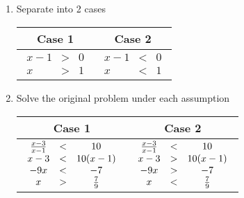 \begin{enumerate}
	\item
	      Separate into 2 cases \\
	      \begin{table}[H]
		      \centering
		      \begin{tabular}{|c|c|} \hline
			      \textbf{Case 1} & \textbf{Case 2}                \\ \hline
			      $ \begin{array}{ccc} x - 1 & > & 0 \\ x & > & 1 \end{array} $
			                      & $ \begin{array}{ccc} x - 1 & < & 0 \\ x & < & 1 \end{array} $ \\ \hline
		      \end{tabular}
	      \end{table}

	\item
	      Solve the original problem under each assumption \\
	      \begin{table}[H]
		      \centering
		      \begin{tabular}{|c|c|} \hline
			      \textbf{Case 1} & \textbf{Case 2}                \\ \hline
			      $ \begin{array}{ccc} {x-3 \over x-1} & < & 10 \\ x - 3 & < & 10(x-1) \\ -9x & < & -7 \\x & > & {7 \over 9} \end{array} $
			                      & $ \begin{array}{ccc} {x-3 \over x-1} & < & 10 \\ x - 3 & > & 10(x-1) \\ -9x & > & -7 \\ x & < & {7 \over 9} \end{array} $ \\ \hline
		      \end{tabular}
	      \end{table}


\end{enumerate}

